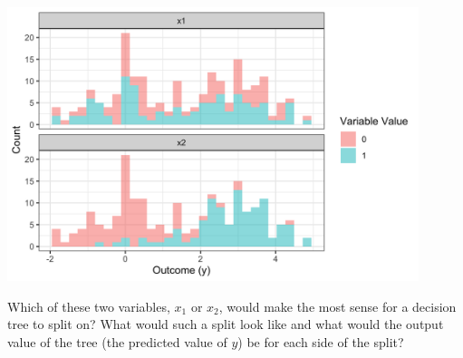 \begin{center}
\includegraphics[width=0.9\textwidth]{img/esl-reg-decision-tree-varsplit.png}
\end{center}

\begin{question}{}
Which of these two variables, $x_1$ or $x_2$, would make the most sense for a decision tree to split on? What would such a split look like and what would the output value of the tree (the predicted value of $y$) be for each side of the split?
\end{question}

